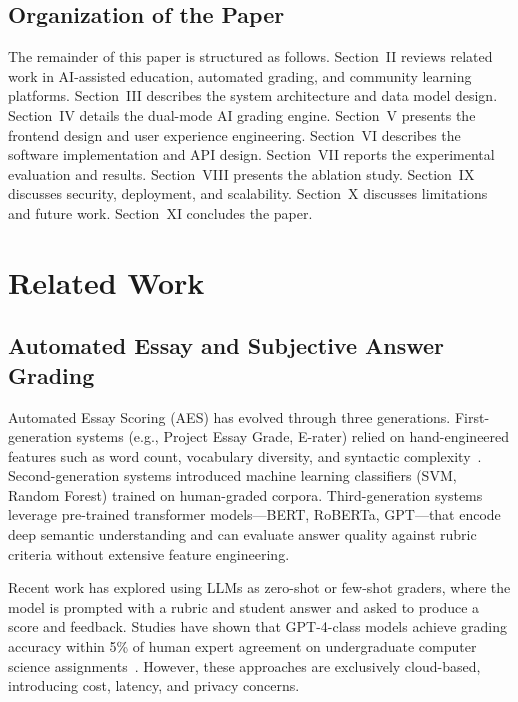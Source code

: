 \documentclass[conference]{IEEEtran}
\begin{document}
\subsection{Organization of the Paper}
The remainder of this paper is structured as follows. Section~II reviews related work in AI-assisted education, automated grading, and community learning platforms. Section~III describes the system architecture and data model design. Section~IV details the dual-mode AI grading engine. Section~V presents the frontend design and user experience engineering. Section~VI describes the software implementation and API design. Section~VII reports the experimental evaluation and results. Section~VIII presents the ablation study. Section~IX discusses security, deployment, and scalability. Section~X discusses limitations and future work. Section~XI concludes the paper.

\section{Related Work}

\subsection{Automated Essay and Subjective Answer Grading}
Automated Essay Scoring (AES) has evolved through three generations. First-generation systems (e.g., Project Essay Grade, E-rater) relied on hand-engineered features such as word count, vocabulary diversity, and syntactic complexity~\cite{auto_grade_survey}. Second-generation systems introduced machine learning classifiers (SVM, Random Forest) trained on human-graded corpora. Third-generation systems leverage pre-trained transformer models---BERT, RoBERTa, GPT---that encode deep semantic understanding and can evaluate answer quality against rubric criteria without extensive feature engineering.

Recent work has explored using LLMs as zero-shot or few-shot graders, where the model is prompted with a rubric and student answer and asked to produce a score and feedback. Studies have shown that GPT-4-class models achieve grading accuracy within 5\% of human expert agreement on undergraduate computer science assignments~\cite{llm_grading}. However, these approaches are exclusively cloud-based, introducing cost, latency, and privacy concerns.
\end{document}
